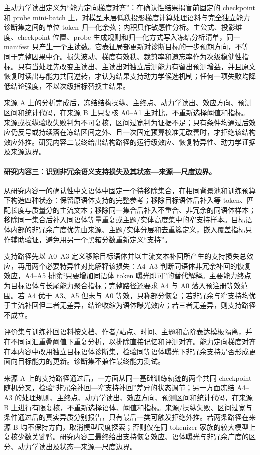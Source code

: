 主动力学读出定义为“能力定向梯度对齐”：在确认性结果揭盲前固定的 checkpoint 和 probe mini-batch 上，对模型末层低秩投影梯度计算处理语料与完全独立能力诊断集之间的单位 token 归一化余弦；内积只作敏感性分析。主公式、投影维度、checkpoint 位置、probe 生成规则和归一化方式写入冻结分析清单，同一 manifest 只产生一个主读数。它表征局部更新对诊断目标的一步预期方向，不等同于完整因果中介。损失波动、梯度有效秩、裁剪率和遗忘率作为次级稳健性指标。只有当处理先改变主读出、主读出对独立后测能力有留出预测增益，并且原文恢复时读出与能力共同逆转，才认为结果支持动力学候选机制；任何一项失败均降低结论强度，不以次级指标替换主结果。

来源 A 上的分析完成后，冻结结构操纵、主终点、动力学读出、效应方向、预测区间和统计代码，在来源 B 上只复核 A0--A1 主对比，不重新选择阈值和指标。来源或操纵验收失败判为不可复核，区间过宽判为证据不足；只有条件均通过后效应仍反号或持续落在冻结区间之外、且一次固定预算校准无改善时，才拒绝该结构效应外推。研究内容二最终给出结构路径的运行级效应、恢复特异性、动力学证据及来源边界。

\paragraph{研究内容三：识别非冗余语义支持损失及其状态—来源—尺度边界。}

从研究内容一的确认性中文语体中固定一个待移除集合，在相同背景池和训练预算下构造四种状态：保留原语体支持的完整参考；移除目标语体后补入等 token、匹配长度与质量分的主流文本；移除同一集合后补入不重合、非冗余的同语体样本；移除同一集合后补入同语体等量重复或主题/实体高度集中的窄支持样本。目标语体内部的非冗余广度优先由来源、主题/实体分层和去重簇定义，嵌入覆盖指标只作辅助验证，避免用另一个黑箱分数重新定义“支持”。

支持路径先以 A0--A3 定义移除目标语体并以主流文本补回所产生的支持损失总效应，再用两个必要特异性对比解释该损失：A4--A3 判断同语体非冗余补回的恢复效应，A4--A5 排除“只要增加同语体 token 曝光即可”的替代解释。主要能力终点为目标语体与长尾能力聚合指标；完整路径还要求 A4 与 A0 落入预注册等效范围。若 A4 优于 A3、A5 但未与 A0 等效，只称部分恢复；若非冗余与窄支持均优于主流补回但二者无差异，结论收缩为语体曝光效应；若三者无差异，则支持路径不成立。

评价集与训练补回语料按文档、作者/站点、时间、主题和高阶表达模板隔离，并在不同词汇重叠阈值下重复分析，以排除直接记忆和评测对齐。能力定向梯度对齐在本内容中改用独立目标语体诊断集，检验同等语体曝光下非冗余支持是否形成更面向目标能力的更新。诊断集不兼作最终能力测试。

来源 A 上的支持路径通过后，一方面从同一基础训练轨迹的两个共同 checkpoint 随机分叉，检验“非冗余补回—窄支持补回”差异的状态调节；另一方面冻结 A4--A3 的处理规则、主终点、动力学读出、效应方向、预测区间和统计代码，在来源 B 上进行有限复核，不重新选择语体、阈值和指标。来源/操纵失败、区间过宽与条件通过后的真实异质分别报告，只有最后一类可触发拒绝外推。若两条路径在来源 B 均不保持方向，取消模型尺度探索；否则仅在同 tokenizer 家族的较大模型上复核少数关键臂。研究内容三最终给出支持恢复效应、语体曝光与非冗余广度的区分、动力学读出及状态—来源—尺度边界。

